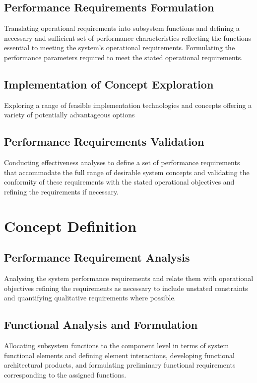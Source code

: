 \documentclass[a4paper,11pt,fleqn]{report}
\begin{document}
\subsection{Performance Requirements Formulation}
Translating operational requirements into subsystem functions and defining a necessary and sufficient set of performance characteristics reflecting the functions essential to meeting the system’s operational requirements. Formulating the performance parameters required to meet the stated operational requirements.

\subsection{Implementation of Concept Exploration}
Exploring a range of feasible implementation technologies and concepts offering a variety of potentially advantageous options 

\subsection{Performance Requirements Validation}
Conducting effectiveness analyses to define a set of performance requirements that accommodate the full range of desirable system concepts and validating the conformity of these requirements with the stated operational objectives and refining the requirements if necessary. 

\section{Concept Definition}
\subsection{Performance Requirement Analysis}
Analysing the system performance requirements and relate them with operational objectives refining the requirements as necessary to include unstated constraints and quantifying qualitative requirements where possible. 

\subsection{Functional Analysis and Formulation} 
Allocating subsystem functions to the component level in terms of system functional elements and defining element interactions, developing functional architectural products, and formulating preliminary functional requirements corresponding to the assigned functions. 
\end{document}
